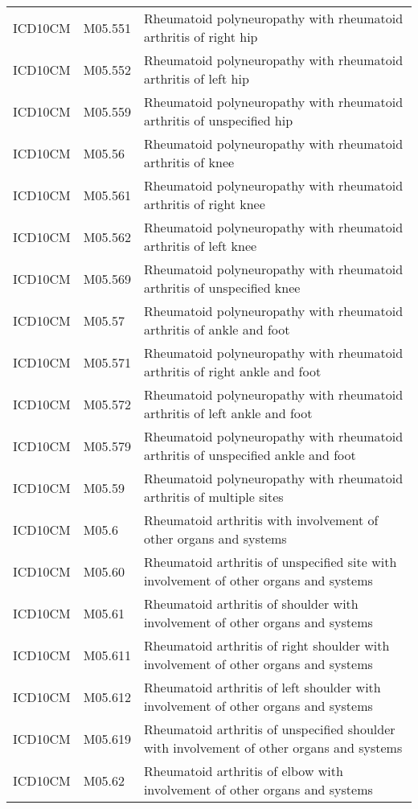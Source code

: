\begin{longtable}{p{}p{}p{}}
  ICD10CM & M05.551 & Rheumatoid polyneuropathy with rheumatoid arthritis of right hip \\ 
  ICD10CM & M05.552 & Rheumatoid polyneuropathy with rheumatoid arthritis of left hip \\ 
  ICD10CM & M05.559 & Rheumatoid polyneuropathy with rheumatoid arthritis of unspecified hip \\ 
  ICD10CM & M05.56 & Rheumatoid polyneuropathy with rheumatoid arthritis of knee \\ 
  ICD10CM & M05.561 & Rheumatoid polyneuropathy with rheumatoid arthritis of right knee \\ 
  ICD10CM & M05.562 & Rheumatoid polyneuropathy with rheumatoid arthritis of left knee \\ 
  ICD10CM & M05.569 & Rheumatoid polyneuropathy with rheumatoid arthritis of unspecified knee \\ 
  ICD10CM & M05.57 & Rheumatoid polyneuropathy with rheumatoid arthritis of ankle and foot \\ 
  ICD10CM & M05.571 & Rheumatoid polyneuropathy with rheumatoid arthritis of right ankle and foot \\ 
  ICD10CM & M05.572 & Rheumatoid polyneuropathy with rheumatoid arthritis of left ankle and foot \\ 
  ICD10CM & M05.579 & Rheumatoid polyneuropathy with rheumatoid arthritis of unspecified ankle and foot \\ 
  ICD10CM & M05.59 & Rheumatoid polyneuropathy with rheumatoid arthritis of multiple sites \\ 
  ICD10CM & M05.6 & Rheumatoid arthritis with involvement of other organs and systems \\ 
  ICD10CM & M05.60 & Rheumatoid arthritis of unspecified site with involvement of other organs and systems \\ 
  ICD10CM & M05.61 & Rheumatoid arthritis of shoulder with involvement of other organs and systems \\ 
  ICD10CM & M05.611 & Rheumatoid arthritis of right shoulder with involvement of other organs and systems \\ 
  ICD10CM & M05.612 & Rheumatoid arthritis of left shoulder with involvement of other organs and systems \\ 
  ICD10CM & M05.619 & Rheumatoid arthritis of unspecified shoulder with involvement of other organs and systems \\ 
  ICD10CM & M05.62 & Rheumatoid arthritis of elbow with involvement of other organs and systems \\ 

\end{longtable}
